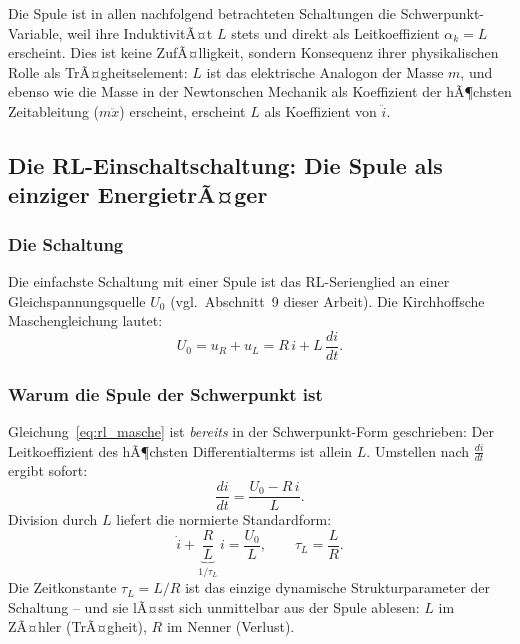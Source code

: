 ﻿\documentclass[12pt, a4paper]{article}
\begin{document}
	Die Spule ist in allen nachfolgend betrachteten Schaltungen die
	Schwerpunkt-Variable, weil ihre InduktivitÃ¤t $L$ stets und direkt als
	Leitkoeffizient $\alpha_k = L$ erscheint. Dies ist keine ZufÃ¤lligkeit,
	sondern Konsequenz ihrer physikalischen Rolle als TrÃ¤gheitselement: $L$
	ist das elektrische Analogon der Masse $m$, und ebenso wie die Masse in
	der Newtonschen Mechanik als Koeffizient der hÃ¶chsten Zeitableitung
	($m\ddot{x}$) erscheint, erscheint $L$ als Koeffizient von $\ddot{i}$.
	
	\subsection{Die RL-Einschaltschaltung: Die Spule als einziger EnergietrÃ¤ger}
	\label{sec:schwerpunkt_rl}
	
	\subsubsection*{Die Schaltung}
	
	Die einfachste Schaltung mit einer Spule ist das RL-Serienglied an einer
	Gleichspannungsquelle $U_0$ (vgl.\ Abschnitt~9 dieser Arbeit). Die
	Kirchhoffsche Maschengleichung lautet:
	\begin{equation}
		U_0 = u_R + u_L = R\,i + L\,\frac{di}{dt}.
		\label{eq:rl_masche}
	\end{equation}
	
	\subsubsection*{Warum die Spule der Schwerpunkt ist}
	
	Gleichung~\eqref{eq:rl_masche} ist \emph{bereits} in der Schwerpunkt-Form
	geschrieben: Der Leitkoeffizient des hÃ¶chsten Differentialterms ist allein
	$L$. Umstellen nach $\frac{di}{dt}$ ergibt sofort:
	\begin{equation}
		\frac{di}{dt} = \frac{U_0 - R\,i}{L}.
		\label{eq:rl_dgl}
	\end{equation}
	Division durch $L$ liefert die normierte Standardform:
	\begin{equation}
		\dot{i} + \underbrace{\frac{R}{L}}_{\displaystyle 1/\tau_L}\,i
		= \frac{U_0}{L},
		\qquad \tau_L = \frac{L}{R}.
		\label{eq:rl_standardform}
	\end{equation}
	Die Zeitkonstante $\tau_L = L/R$ ist das einzige dynamische
	Strukturparameter der Schaltung -- und sie lÃ¤sst sich unmittelbar aus der
	Spule ablesen: $L$ im ZÃ¤hler (TrÃ¤gheit), $R$ im Nenner (Verlust).
	
\end{document}

